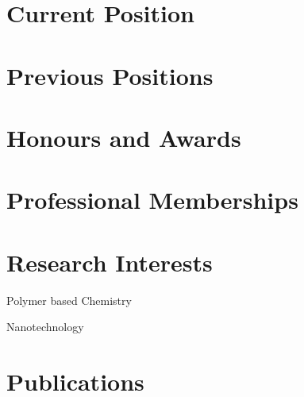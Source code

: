 \documentclass{scrvitae2}
\begin{document}
\section{Current Position}

\section{Previous Positions}

\section{Honours and Awards}

\section{Professional Memberships}

\section{Research Interests}
\begin{outerlist}
    \item Polymer based Chemistry
    \item Nanotechnology
\end{outerlist}

\section{Publications}
\end{document}
